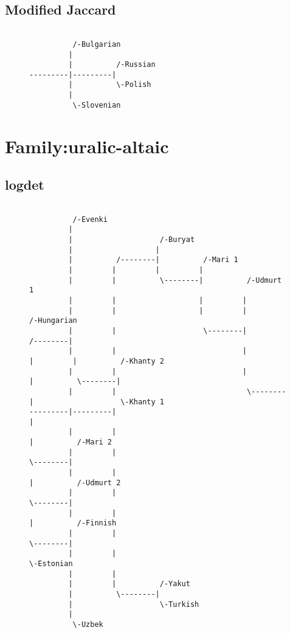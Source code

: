 \subsection{Modified Jaccard}
\begin{figure}[!htb]
\begin{center}
{
\selectfont
\begin{verbatim}

          /-Bulgarian
         |
         |          /-Russian
---------|---------|
         |          \-Polish
         |
          \-Slovenian

\end{verbatim}
}
\label{...}
\end{center}
\end{figure}
\section{Family:uralic-altaic}
\subsection{logdet}
\begin{figure}[!htb]
\begin{center}
{
\selectfont
\begin{verbatim}

          /-Evenki
         |
         |                    /-Buryat
         |                   |
         |          /--------|          /-Mari 1
         |         |         |         |
         |         |          \--------|          /-Udmurt 1
         |         |                   |         |
         |         |                   |         |                    /-Hungarian
         |         |                    \--------|          /--------|
         |         |                             |         |         |          /-Khanty 2
         |         |                             |         |          \--------|
         |         |                              \--------|                    \-Khanty 1
---------|---------|                                       |
         |         |                                       |          /-Mari 2
         |         |                                        \--------|
         |         |                                                 |          /-Udmurt 2
         |         |                                                  \--------|
         |         |                                                           |          /-Finnish
         |         |                                                            \--------|
         |         |                                                                      \-Estonian
         |         |
         |         |          /-Yakut
         |          \--------|
         |                    \-Turkish
         |
          \-Uzbek

\end{verbatim}
}
\label{...}
\end{center}
\end{figure}

